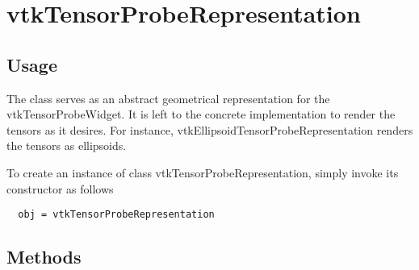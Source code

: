 \section{vtkTensorProbeRepresentation}

\subsection{Usage}

 The class serves as an abstract geometrical representation for the
 vtkTensorProbeWidget. It is left to the concrete implementation to render
 the tensors as it desires. For instance, 
 vtkEllipsoidTensorProbeRepresentation renders the tensors as ellipsoids.


To create an instance of class vtkTensorProbeRepresentation, simply
invoke its constructor as follows
\begin{verbatim}
  obj = vtkTensorProbeRepresentation
\end{verbatim}
\subsection{Methods}


